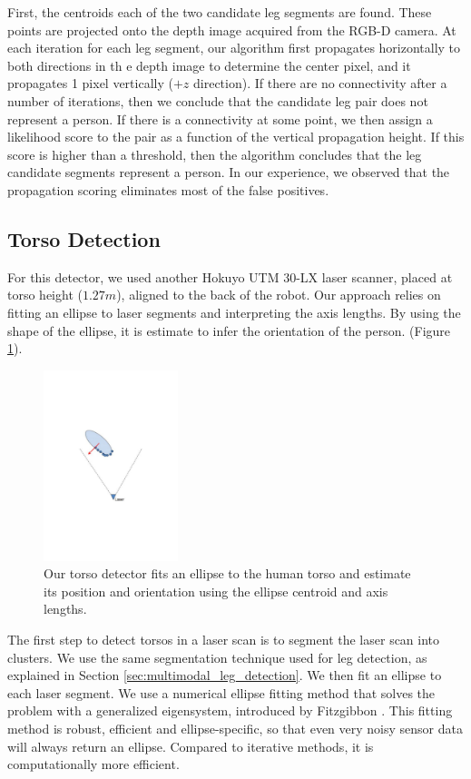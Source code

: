 First, the centroids each of the two candidate leg segments are found.  These points are projected onto the depth image acquired from the RGB-D camera. At each iteration for each leg segment, our algorithm first propagates horizontally to both directions in th e depth image to determine the center pixel, and it propagates 1 pixel vertically ($+z$ direction). If there are no connectivity after a number of iterations, then we conclude that the candidate leg pair does not represent a person. If there is a connectivity at some point, we then assign a likelihood score to the pair as a function of the vertical propagation height. If this score is higher than a threshold, then the algorithm concludes that the leg candidate segments represent a person. In our experience, we observed that the propagation scoring eliminates most of the false positives.

\subsection{Torso Detection}
\label{sec:multimodal_torso_detection}

For this detector, we used another Hokuyo UTM 30-LX laser scanner, placed at torso height ($1.27m$), aligned to the back of the robot. Our approach relies on fitting an ellipse to laser segments and interpreting the axis lengths. By using the shape of the ellipse, it is estimate to infer the orientation of the person. (Figure \ref{fig:ellipse}).

\begin{figure}[ht!]
\centering
\includegraphics[width=0.35\textwidth]{pics/ellipse}
\caption{Our torso detector fits an ellipse to the human torso and estimate its position and orientation using the ellipse centroid and axis lengths.}
\label{fig:ellipse}
\end{figure}

The first step to detect torsos in a laser scan is to segment the laser scan into clusters. We use the same segmentation technique used for leg detection, as explained in Section \ref{sec:multimodal_leg_detection}. We then fit an ellipse to each laser segment. We use a numerical ellipse fitting method that solves the problem with a generalized eigensystem, introduced by Fitzgibbon \cite{fitzgibbon1999direct}. This fitting method is robust, efficient and ellipse-specific, so that even very noisy sensor data will always return an ellipse. Compared to iterative methods, it is computationally more efficient.

